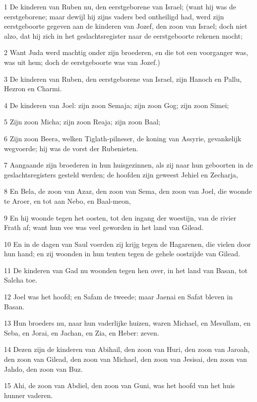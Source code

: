 \par 1 De kinderen van Ruben nu, den eerstgeborene van Israel; (want hij was de eerstgeborene; maar dewijl hij zijns vaders bed ontheiligd had, werd zijn eerstgeboorte gegeven aan de kinderen van Jozef, den zoon van Israel; doch niet alzo, dat hij zich in het geslachtsregister naar de eerstgeboorte rekenen mocht;
\par 2 Want Juda werd machtig onder zijn broederen, en die tot een voorganger was, was uit hem; doch de eerstgeboorte was van Jozef.)
\par 3 De kinderen van Ruben, den eerstgeborene van Israel, zijn Hanoch en Pallu, Hezron en Charmi.
\par 4 De kinderen van Joel: zijn zoon Semaja; zijn zoon Gog; zijn zoon Simei;
\par 5 Zijn zoon Micha; zijn zoon Reaja; zijn zoon Baal;
\par 6 Zijn zoon Beera, welken Tiglath-pilneser, de koning van Assyrie, gevankelijk wegvoerde; hij was de vorst der Rubenieten.
\par 7 Aangaande zijn broederen in hun huisgezinnen, als zij naar hun geboorten in de geslachtsregisters gesteld werden; de hoofden zijn geweest Jehiel en Zecharja,
\par 8 En Bela, de zoon van Azaz, den zoon van Sema, den zoon van Joel, die woonde te Aroer, en tot aan Nebo, en Baal-meon,
\par 9 En hij woonde tegen het oosten, tot den ingang der woestijn, van de rivier Frath af; want hun vee was veel geworden in het land van Gilead.
\par 10 En in de dagen van Saul voerden zij krijg tegen de Hagarenen, die vielen door hun hand; en zij woonden in hun tenten tegen de gehele oostzijde van Gilead.
\par 11 De kinderen van Gad nu woonden tegen hen over, in het land van Basan, tot Salcha toe.
\par 12 Joel was het hoofd; en Safam de tweede; maar Jaenai en Safat bleven in Basan.
\par 13 Hun broeders nu, naar hun vaderlijke huizen, waren Michael, en Mesullam, en Seba, en Jorai, en Jachan, en Zia, en Heber: zeven.
\par 14 Dezen zijn de kinderen van Abihail, den zoon van Huri, den zoon van Jaroah, den zoon van Gilead, den zoon van Michael, den zoon van Jesisai, den zoon van Jahdo, den zoon van Buz.
\par 15 Ahi, de zoon van Abdiel, den zoon van Guni, was het hoofd van het huis hunner vaderen.
